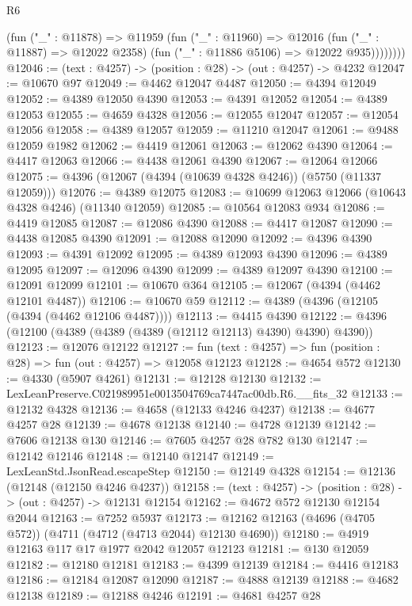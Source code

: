 \begin{lexlean}{R6}
\begin{coremodule}
              (fun ("_" : @11878) =>
              @11959
                (fun ("_" : @11960) =>
                @12016
                  (fun ("_" : @11887) => @12022 @2358)
                  (fun ("_" : @11886 @5106) => @12022 @935))))))))
@12046 := (text : @4257) -> (position : @28) -> (out : @4257) -> @4232
@12047 := @10670 @97
@12049 := @4462 @12047 @4487
@12050 := @4394 @12049
@12052 := @4389 @12050 @4390
@12053 := @4391 @12052
@12054 := @4389 @12053
@12055 := @4659 @4328
@12056 := @12055 @12047
@12057 := @12054 @12056
@12058 := @4389 @12057
@12059 := @11210 @12047
@12061 := @9488 @12059 @1982
@12062 := @4419 @12061
@12063 := @12062 @4390
@12064 := @4417 @12063
@12066 := @4438 @12061 @4390
@12067 := @12064 @12066
@12075 := @4396 (@12067 (@4394 (@10639 @4328 @4246)) (@5750 (@11337 @12059)))
@12076 := @4389 @12075
@12083 := @10699 @12063 @12066 (@10643 @4328 @4246) (@11340 @12059)
@12085 := @10564 @12083 @934
@12086 := @4419 @12085
@12087 := @12086 @4390
@12088 := @4417 @12087
@12090 := @4438 @12085 @4390
@12091 := @12088 @12090
@12092 := @4396 @4390
@12093 := @4391 @12092
@12095 := @4389 @12093 @4390
@12096 := @4389 @12095
@12097 := @12096 @4390
@12099 := @4389 @12097 @4390
@12100 := @12091 @12099
@12101 := @10670 @364
@12105 := @12067 (@4394 (@4462 @12101 @4487))
@12106 := @10670 @59
@12112 := @4389 (@4396 (@12105 (@4394 (@4462 @12106 @4487))))
@12113 := @4415 @4390
@12122 := @4396 (@12100 (@4389 (@4389 (@4389 (@12112 @12113) @4390) @4390) @4390))
@12123 := @12076 @12122
@12127 := fun (text : @4257) => fun (position : @28) => fun (out : @4257) => @12058 @12123
@12128 := @4654 @572
@12130 := @4330 (@5907 @4261)
@12131 := @12128 @12130
@12132 := LexLeanPreserve.C021989951e0013504769ca7447ac00db.R6.__fits_32
@12133 := @12132 @4328
@12136 := @4658 (@12133 @4246 @4237)
@12138 := @4677 @4257 @28
@12139 := @4678 @12138
@12140 := @4728 @12139
@12142 := @7606 @12138 @130
@12146 := @7605 @4257 @28 @782 @130
@12147 := @12142 @12146
@12148 := @12140 @12147
@12149 := LexLeanStd.JsonRead.escapeStep
@12150 := @12149 @4328
@12154 := @12136 (@12148 (@12150 @4246 @4237))
@12158 := (text : @4257) -> (position : @28) -> (out : @4257) -> @12131 @12154
@12162 := @4672 @572 @12130 @12154 @2044
@12163 := @7252 @5937
@12173 := @12162 @12163 (@4696 (@4705 @572)) (@4711 (@4712 (@4713 @2044) @12130 @4690))
@12180 := @4919 @12163 @117 @17 @1977 @2042 @12057 @12123
@12181 := @130 @12059
@12182 := @12180 @12181
@12183 := @4399 @12139
@12184 := @4416 @12183
@12186 := @12184 @12087 @12090
@12187 := @4888 @12139
@12188 := @4682 @12138
@12189 := @12188 @4246
@12191 := @4681 @4257 @28

\end{coremodule}
\end{lexlean}
